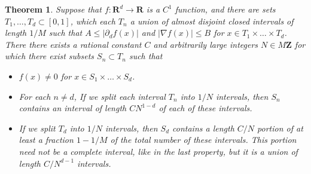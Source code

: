 \documentclass{report}
\theoremstyle{plain}
\theoremstyle{plain}
\newtheorem{theorem}{Theorem}
\begin{document}
\begin{theorem}
    Suppose that $f: \mathbf{R}^d \to \mathbf{R}$ is a $C^1$ function, and there are sets $T_1, \dots, T_d \subset [0,1]$, which each $T_n$ a union of almost disjoint closed intervals of length $1/M$ such that $A \leq |\partial_d f(x)|$ and $|\nabla f(x)| \leq B$ for $x \in T_1 \times \dots \times T_d$. There there exists a rational constant $C$ and arbitrarily large integers $N \in M \mathbf{Z}$ for which there exist subsets $S_n \subset T_n$ such that
    \begin{itemize}
        \item[(i)] $f(x) \neq 0$ for $x \in S_1 \times \dots \times S_d$.

        \item[(ii)] For each $n \neq d$, If we split each interval $T_n$ into $1/N$ intervals, then $S_n$ contains an interval of length $CN^{1-d}$ of each of these intervals.

        \item[(iii)] If we split $T_d$ into $1/N$ intervals, then $S_d$ contains a length $C/N$ portion of at least a fraction $1 - 1/M$ of the total number of these intervals. This portion need not be a complete interval, like in the last property, but it is a union of length $C/N^{d-1}$ intervals.
    \end{itemize}
\end{theorem}
\end{document}
